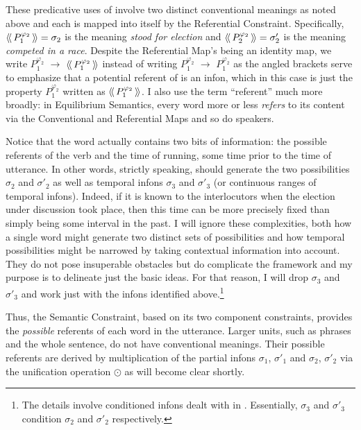 These predicative uses of  involve two distinct conventional meanings as noted above and each is mapped into itself by the Referential Constraint. Specifically, $\langle\!\langle\,P^{\varphi_2}_1\,\rangle\!\rangle = \sigma_2$ is the meaning \emph{stood for election} and $\langle\!\langle\,P^{\varphi_2}_2\,\rangle\!\rangle = \sigma'_2$ is the meaning \emph{competed in a race}. Despite the Referential Map's being an identity map,  we write $P^{\varphi_2}_1$ $\longrightarrow$\hspace{-1.1em}\raisebox{1ex}{\scriptsize $u$}\hspace{.55em} $\langle\!\langle\,P^{\varphi_2}_1\,\rangle\!\rangle$ instead of writing $P^{\varphi_2}_1$ $\longrightarrow$\hspace{-1.1em}\raisebox{1ex}{\scriptsize $u$}\hspace{.55em} $P^{\varphi_2}_1$ as the angled brackets serve to emphasize that a potential referent of  is an infon, which in this case is just the property $P^{\varphi_2}_1$ written as $\langle\!\langle\,P^{\varphi_2}_1\,\rangle\!\rangle$. I also use the term ``referent'' much more broadly: in Equilibrium Semantics, every word more or less \emph{refers} to its content via the Conventional and Referential Maps and so do speakers.

Notice that the word  actually contains two bits of information: the possible referents of the verb  and the time of running, some time prior to the time of utterance. In other words, strictly speaking,  should generate the two possibilities $\sigma_2$ and $\sigma'_2$ as well as temporal infons $\sigma_3$ and $\sigma'_3$ (or continuous ranges of temporal infons). Indeed, if it is known to the interlocutors when the election under discussion took place, then this time can be more precisely fixed than simply being some interval in the past. I will ignore these complexities, both how a single word might generate two distinct sets of possibilities and how temporal possibilities might be narrowed by taking contextual information into account. They do not pose insuperable obstacles but do complicate the framework and my purpose is to delineate just the basic ideas. For that reason, I will drop $\sigma_3$ and $\sigma'_3$ and work just with the infons identified above.\footnote{The details involve conditioned infons dealt with in \citet{parikh:le}. Essentially, $\sigma_3$ and $\sigma'_3$ condition $\sigma_2$ and $\sigma'_2$ respectively.}

Thus, the Semantic Constraint, based on its two component constraints, provides the \emph{possible} referents of each word in the utterance. Larger units, such as phrases and the whole sentence, do not have conventional meanings. Their possible referents are derived by multiplication of the partial infons $\sigma_1$, $\sigma'_1$ and $\sigma_2$, $\sigma'_2$ via the unification operation $\odot$ as will become clear shortly.

